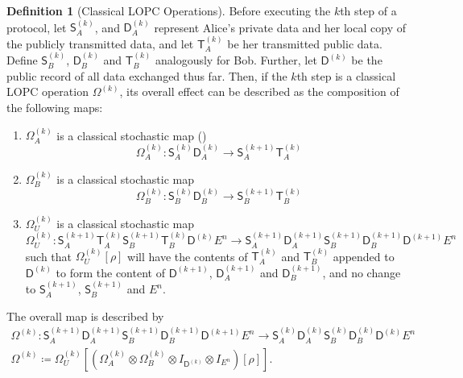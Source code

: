 \documentclass[10pt, a4paper]{article}
\numberwithin{equation}{section} %
\newcounter{stmt} %
\theoremstyle{definition}
\newtheorem{defn}[stmt]{Definition}
\theoremstyle{plain}
\newcommand{\?}{\mathrel{?}} %
\newcommand{\crv}[1]{\mathsf{#1}}
\begin{document}
    \begin{defn}[Classical LOPC Operations]\label{def:lopc}
      Before executing the \(k\)th step of a protocol, let \(\crv{S}_A^{(k)}\), and \(\crv{D}_A^{(k)}\) represent Alice's private data and her local copy of the publicly transmitted data, and let \(\crv{T}^{(k)}_A\) be her transmitted public data. Define \(\crv{S}_B^{(k)}\), \(\crv{D}_B^{(k)}\) and \(\crv{T}_B^{(k)}\) analogously for Bob. Further, let \(\crv{D}^{(k)}\) be the public record of all data exchanged thus far. Then, if the \(k\)th step is a classical LOPC operation \(\Omega^{(k)}\), its overall effect can be described as the composition of the following maps:
      \begin{enumerate}
        \item \(\Omega_A^{(k)}\) is a classical stochastic map ()
          \begin{equation}
            \Omega_A^{(k)} : \crv{S}_A^{(k)}\crv{D}_A^{(k)} \to \crv{S}_A^{(k+1)}\crv{T}_A^{(k)}
          \end{equation}
        \item \(\Omega_B^{(k)}\) is a classical stochastic map 
          \begin{equation}
            \Omega_B^{(k)} : \crv{S}_B^{(k)}\crv{D}_B^{(k)} \to \crv{S}_B^{(k+1)}\crv{T}_B^{(k)}
          \end{equation}
        \item \(\Omega_U^{(k)}\) is a classical stochastic map
          \begin{equation}
            \Omega_U^{(k)} : \crv{S}_A^{(k+1)}\crv{T}_A^{(k)}
            \crv{S}_B^{(k+1)}\crv{T}_B^{(k)}
            \crv{D}^{(k)}E^n \to
            \crv{S}_A^{(k+1)}\crv{D}_A^{(k+1)}
            \crv{S}_B^{(k+1)}\crv{D}_B^{(k+1)}
            \crv{D}^{(k+1)}E^n
          \end{equation}
          such that \(\Omega_U^{(k)}\left[\rho\right]\) will have the contents of \(\crv{T}^{(k)}_A\) and \(\crv{T}^{(k)}_B\) appended to \(\crv{D}^{(k)}\) to form the content of \(\crv{D}^{(k+1)}\), \(\crv{D}_A^{(k+1)}\) and \(\crv{D}_B^{(k+1)}\), and no change to \(\crv{S}_A^{(k+1)}\), \(\crv{S}_B^{(k+1)}\) and \(E^n\).
      \end{enumerate}
    \item The overall map is described by
      \begin{gather}
        \Omega^{(k)} : \crv{S}_A^{(k+1)}\crv{D}_A^{(k+1)}
        \crv{S}_B^{(k+1)}\crv{D}_B^{(k+1)}\crv{D}^{(k+1)}E^n \to
        \crv{S}_A^{(k)}\crv{D}_A^{(k)}
        \crv{S}_B^{(k)}\crv{D}_B^{(k)}
        \crv{D}^{(k)}E^n \\
        \Omega^{(k)} \coloneqq \Omega_U^{(k)}\left[\left(\Omega_A^{(k)} \otimes \Omega_B^{(k)} \otimes I_{\crv{D}^{(k)}} \otimes I_{E^n}\right)\left[\rho\right] \right].
      \end{gather}
    \end{defn}
\end{document}
